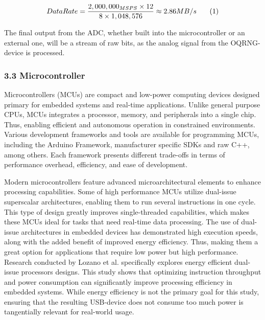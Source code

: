 \[
Data Rate = \frac{2,000,000_{MSPS} \times 12}{8 \times 1,048,576} \approx 2.86 MB/s \text{\phantom{123} (1)}
\]

The final output from the ADC, whether built into the microcontroller or an external one, will be a stream of raw bits, as the analog signal from the OQRNG-device is processed.

\hypertarget{microcontroller}{%
\subsubsection{3.3 Microcontroller}\label{microcontroller}}

Microcontrollers (MCUs) are compact and low-power computing devices designed primary for embedded systems and real-time applications. Unlike general purpose CPUs, MCUs integrates a processor, memory, and peripherals into a single chip. Thus, enabling efficient and autonomous operation in constrained environments. Various development frameworks and tools are available for programming MCUs, including the Arduino Framework, manufacturer specific SDKs and raw C++, among others. Each framework presents different trade-offs in terms of performance overhead, efficiency, and ease of development.

Modern microcontrollers feature advanced microarchitectural elements to enhance processing capabilities. Some of high performance MCUs utilize dual-issue superscalar architectures, enabling them to run several instructions in one cycle. This type of design greatly improves single-threaded capabilities, which makes these MCUs ideal for tasks that need real-time data processing. The use of dual-issue architectures in embedded devices has demonstrated high execution speeds, along with the added benefit of improved energy efficiency. Thus, making them a great option for applications that require low power but high performance. Research conducted by Lozano et al. \cite{dual-issue} specifically explores energy efficient dual-issue processors designs. This study shows that optimizing instruction throughput and power consumption can significantly improve processing efficiency in embedded systems. While energy efficiency is not the primary goal for this study, ensuring that the resulting USB-device does not consume too much power is tangentially relevant for real-world usage.

